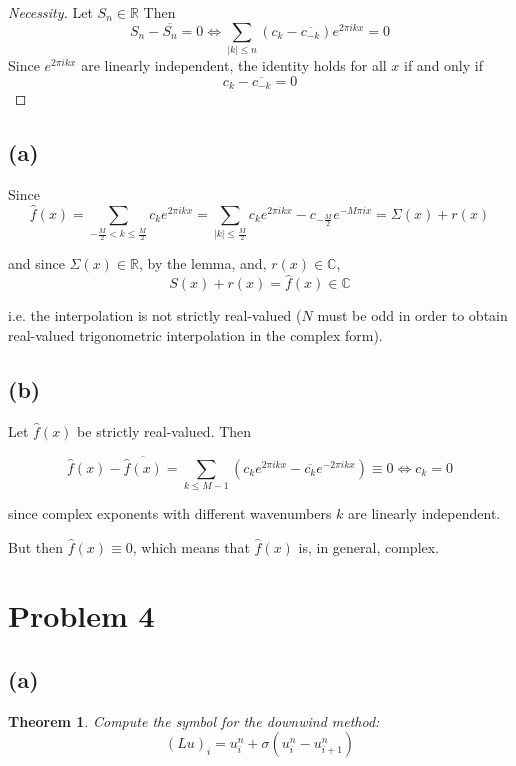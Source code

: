 \documentclass[a4paper]{amsproc}
\theoremstyle{plain}
\newtheorem*{thm}{Theorem}
\theoremstyle{definition}
\theoremstyle{remark}
\numberwithin{equation}{section}
\begin{document}
\begin{proof}[Necessity] Let $S_n \in \mathbb{R}$ Then $$ S_n - \overline{S_n} = 0 \Longleftrightarrow \sum\limits_{\lvert k \rvert \leq n} (c_k - \overline{c_{-k}}) e^{2 \pi i k x} = 0$$
Since $e^{2 \pi i k x}$ are linearly independent, the identity holds for all $x$ if and only if $$c_k - \overline{c_{-k}} = 0$$
\end{proof}

\subsection*{(a)}
Since $$ \hat{f}(x) = \sum\limits_{-\frac{M}{2} < k \leq \frac{M}{2}} c_k e^{2 \pi i k x} = \sum\limits_{\lvert k \rvert \leq \frac{M}{2}} c_k e^{2 \pi i k x} - c_{-\frac{M}{2}} e^{-M \pi i x} = \Sigma(x) + r(x) $$

and since $\Sigma(x) \in \mathbb{R}$, by the lemma, and, $r(x) \in \mathbb{C}$, $$ S(x)+r(x) = \hat{f}(x) \in \mathbb{C} $$ 

i.e. the interpolation is not strictly real-valued ($N$ must be odd in order to obtain real-valued trigonometric interpolation in the complex form).
\subsection*{(b)}

Let $ \hat{f}(x)$ be strictly real-valued. Then

$$ \hat{f}(x) - \overline{\hat{f}(x)} = \sum\limits_{k \leq M-1} (c_k e^{2 \pi i k x} - \overline{c_k} e^{-2 \pi i k x}) \equiv 0 \Longleftrightarrow c_k = 0 $$

since complex exponents with different wavenumbers $k$ are linearly independent. 

But then $\hat{f}(x) \equiv 0 $, which means that $\hat{f}(x)$ is, in general, complex.

\section*{Problem 4}

  \subsection*{(a)}

  \begin{thm}
  Compute the symbol for the downwind method: $$ (Lu)_i = u^n_i + \sigma(u^n_i - u^n_{i+1}) $$
  \end{thm}
\end{document}
